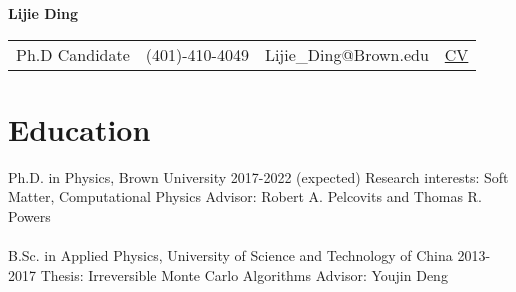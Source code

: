 \documentclass[11pt,letterpaper]{article}
\begin{document}
\pagestyle{headings}

\begin{center}
    \Large{\textbf{Lijie Ding}} \\
\end{center}
\begin{center}
    \begin{tabular}{l l l l}
        Ph.D Candidate & (401)-410-4049 & Lijie\_Ding@Brown.edu & \href{https://ljding94.github.io/file/cv_resume/cv.pdf}{CV}
    \end{tabular}
\end{center}


\section*{Education}
Ph.D. in Physics, Brown University \hfill 2017-2022 (expected)\newline
Research interests: Soft Matter, Computational Physics \newline
Advisor: Robert A. Pelcovits and Thomas R. Powers
\\~\\
B.Sc. in Applied Physics, University of Science and Technology of China \hfill 2013-2017\newline
Thesis: Irreversible Monte Carlo Algorithms \newline
Advisor: Youjin Deng
\end{document}
